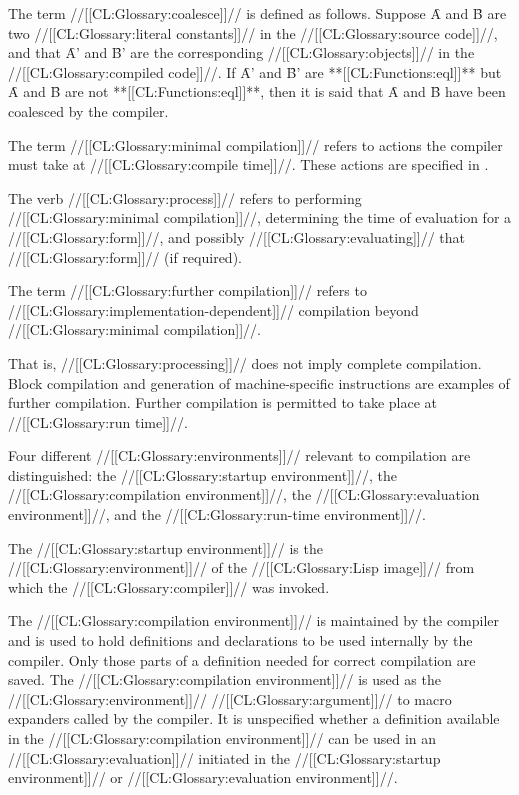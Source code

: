  




The term //[[CL:Glossary:coalesce]]// is defined as follows.
Suppose \f{A} and \f{B} are two //[[CL:Glossary:literal constants]]// in the //[[CL:Glossary:source code]]//,
and that \f{A'} and \f{B'} are the corresponding //[[CL:Glossary:objects]]// in the //[[CL:Glossary:compiled code]]//.
If \f{A'} and \f{B'} are **[[CL:Functions:eql]]** but
\f{A} and \f{B} are not **[[CL:Functions:eql]]**, then it is said
that \f{A} and \f{B} have been coalesced by the compiler.


The term //[[CL:Glossary:minimal compilation]]// refers to actions the compiler
must take at //[[CL:Glossary:compile time]]//. These actions are specified in 
\secref\CompilationSemantics.


The verb //[[CL:Glossary:process]]// refers to performing //[[CL:Glossary:minimal compilation]]//,
determining the time of evaluation for a //[[CL:Glossary:form]]//,
and possibly //[[CL:Glossary:evaluating]]// that //[[CL:Glossary:form]]// (if required).


The term //[[CL:Glossary:further compilation]]// refers to
//[[CL:Glossary:implementation-dependent]]// compilation beyond //[[CL:Glossary:minimal compilation]]//.

That is, //[[CL:Glossary:processing]]// does not imply complete compilation.
Block compilation and generation of machine-specific instructions are 
examples of further compilation.
Further compilation is permitted to take place at //[[CL:Glossary:run time]]//.


Four different //[[CL:Glossary:environments]]// relevant to compilation are
distinguished:
  the //[[CL:Glossary:startup environment]]//,
  the //[[CL:Glossary:compilation environment]]//,
  the //[[CL:Glossary:evaluation environment]]//, and
  the //[[CL:Glossary:run-time environment]]//.


The //[[CL:Glossary:startup environment]]// is
the //[[CL:Glossary:environment]]// of the //[[CL:Glossary:Lisp image]]// 
from which the //[[CL:Glossary:compiler]]// was invoked.



The //[[CL:Glossary:compilation environment]]// is maintained by the compiler
and is used to hold definitions and declarations to be used internally
by the compiler.  Only those parts of a definition needed for correct
compilation are saved. The //[[CL:Glossary:compilation environment]]// is used
as the //[[CL:Glossary:environment]]// //[[CL:Glossary:argument]]// to macro expanders called by
the compiler. It is unspecified whether a definition available in the
//[[CL:Glossary:compilation environment]]// can be used in an //[[CL:Glossary:evaluation]]//
initiated in the //[[CL:Glossary:startup environment]]// or //[[CL:Glossary:evaluation environment]]//.


